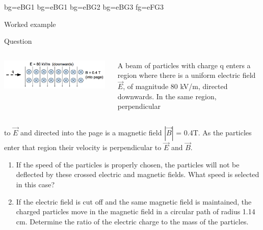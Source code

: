%
%

{
 {bg=eBG1}
 {bg=eBG1}
 {bg=eBG2}
 {bg=eBG3}
 {fg=eFG3}

%
%
%

\begin{frame}{Worked example}

\begin{blockexmplque}{Question}

\begin{columns}
  \begin{column}{0.38\textwidth}
    \begin{center}
      \includegraphics[width=0.98\textwidth]{./images/problems/lect4_crossed_E_B_fields.png}\\
    \end{center}
  \end{column}
  \begin{column}{0.62\textwidth}
A beam of particles with charge q enters
a region where there is a uniform electric field $\vec{E}$, of
magnitude 80 kV/m, directed downwards.
In the same region, perpendicular
  \end{column}
\end{columns}
to  $\vec{E}$ and directed into the page is a magnetic
field  $|\vec{B}|$ = 0.4T.
As the particles enter that region their
velocity is perpendicular to $\vec{E}$ and $\vec{B}$.\\
\begin{enumerate}
\item
 If the speed of the particles is properly chosen, the particles will
not be deflected by these crossed electric and magnetic fields.
What speed is selected in this case?
\item
If the electric field is cut off and the same magnetic field is maintained, the charged
particles move in the magnetic field in a circular path of radius 1.14 cm. Determine the
ratio of the electric charge to the mass of the particles.
\end{enumerate}
\end{blockexmplque}
\vspace{0.4cm}


\end{frame}}
